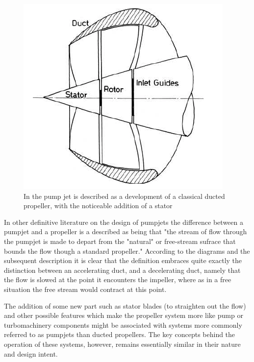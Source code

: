\documentclass{article}\usepackage[]{graphicx}\usepackage[]{color}
\begin{document}
\begin{figure}
\includegraphics[width=\textwidth]{PumpjetOutline.png}
\caption{In \cite{carlton2007} the pump jet is described as a development of a classical ducted propeller, with the noticeable addition of a stator}
\label{fig:PumpjetOutline.png}
\end{figure}

In other definitive literature on the design of pumpjets \parencite{henderson1964} the difference between a pumpjet and a propeller is a described as being that "the stream of flow through the pumpjet is made to depart from the "natural" or free-stream sufrace that bounds the flow though a standard propeller."  According to the diagrams and the subsequent description it is clear that the definition embraces quite exactly the distinction between an accelerating duct, and a decelerating duct, namely that the flow is slowed at the point it encounters the impeller, where as in a free situation the free stream would contract at this point.

The addition of some new part such as stator blades (to straighten out the flow) and other possible features which make the propeller system more like pump or turbomachinery components might be associated with systems more commonly referred to as pumpjets than ducted propellers. The key concepts behind the operation of these systems, however, remains essentially similar in their nature and design intent.
\end{document}
